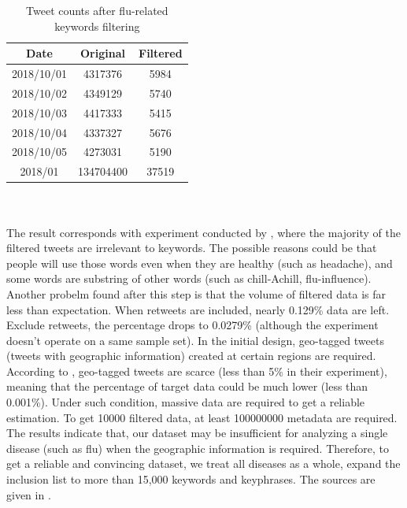\begin{table}[!htbp]
    \centering
    \hspace{0.5cm}
    \begin{tabular}{ccc}
        Date & Original & Filtered \\ \hline
        2018/10/01 & 4317376 & 5984 \\
        2018/10/02 & 4349129 & 5740 \\
        2018/10/03 & 4417333 & 5415 \\
        2018/10/04 & 4337327 & 5676 \\
        2018/10/05 & 4273031 & 5190 \\
        2018/01 & 134704400 & 37519 \\
    \end{tabular}
    \caption{Tweet counts after flu-related keywords filtering}
    \label{tab:filtering}
\end{table}
\\\\
The result corresponds with experiment conducted by \cite{culotta2010towards}, where the majority of the filtered tweets are irrelevant to keywords. The possible reasons could be that people will use those words even when they are healthy (such as headache), and some words are substring of other words (such as chill-Achill, flu-influence). Another probelm found after this step is that the volume of filtered data is far less than expectation. When retweets are included, nearly 0.129\% data are left. Exclude retweets, the percentage drops to 0.0279\% (although the experiment doesn't operate on a same sample set). In the initial design, geo-tagged tweets (tweets with geographic information) created at certain regions are required. According to \cite{sloan}, geo-tagged tweets are scarce (less than 5\% in their experiment), meaning that the percentage of target data could be much lower (less than 0.001\%). Under such condition, massive data are required to get a reliable estimation. To get 10000 filtered data, at least 100000000 metadata are required. The results indicate that, our dataset may be insufficient for analyzing a single disease (such as flu) when the geographic information is required. Therefore, to get a reliable and convincing dataset, we treat all diseases as a whole, expand the inclusion list to more than 15,000 keywords and keyphrases. The sources are given in \cite{paul2011you}.

